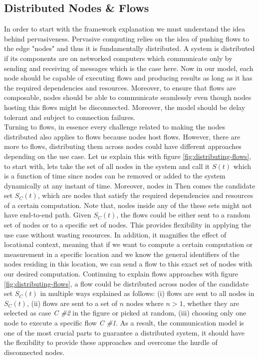 \subsection{Distributed Nodes \& Flows}
In order to start with the framework explanation we must understand the idea behind pervasiveness. Pervasive computing relies on the idea of pushing flows to the edge "nodes" and thus it is fundamentally distributed. A system is distributed if its components  are on networked computers which communicate only by sending and receiving of messages \cite{DSYS} which is the case here. Now in our model, each node should be capable of executing flows and producing results as long as it has the required dependencies and resources. Moreover, to ensure that flows are composable, nodes should be able to communicate seamlessly even though nodes hosting this flows might be disconnected. Moreover, the model should be delay tolerant and subject to connection failures.\\



\noindent Turning to flows, in essence every challenge related to making the nodes distributed also applies to flows because nodes host flows. However, there are more to flows, distributing them across nodes could have different approaches depending on the use case. Let us explain this with figure \ref{fig:distributing-flows}, to start with, lets take the set of all nodes in the system and call it \(S(t)\) which is a function of time since nodes can be removed or added to the system dynamically at any instant of time. Moreover, nodes in  Then comes the candidate set \(S_C(t)\), which are nodes that satisfy the required dependencies and resources of a certain computation. Note that, nodes inside any of the these sets might not have end-to-end path. Given \(S_C(t)\), the flows could be either sent to a random set of nodes or to a specific set of nodes. This provides flexibility in applying the use case without wasting resources. In addition, it magnifies the effect of locational context, meaning that if we want to compute a certain computation or measurement in a specific location  and we know the general identifiers of  the  nodes residing in this location, we can send a flow to this exact set of nodes with our desired computation. Continuing to explain flows approaches with figure \ref{fig:distributing-flows}, a flow could be distributed across nodes of the candidate set  \(S_C(t)\) in multiple ways explained as follows: (i) flows are sent to all nodes in  \(S_C(t)\), (ii) flows are sent to a set of  \(n\)  nodes where \(n > 1\), whether they are selected as case \textit{C \#2} in the figure or picked at random, (iii) choosing only one node to execute a specific flow \textit{C \#1}. As a result, the communication model is one of the most crucial parts to guarantee a distributed system, it should have the flexibility to provide these approaches and overcome the hurdle of disconnected nodes.
 
